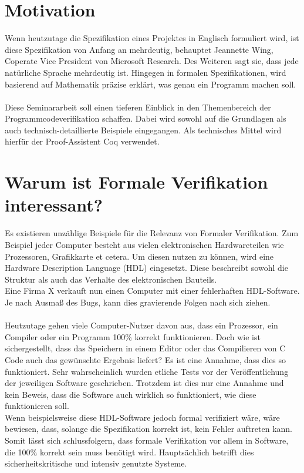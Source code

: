 \section{Motivation}
{Wenn heutzutage die Spezifikation eines Projektes in Englisch formuliert wird, ist diese Spezifikation von Anfang an mehrdeutig, behauptet Jeannette Wing, Coperate Vice President von Microsoft Research. Des Weiteren sagt sie, dass jede natürliche Sprache mehrdeutig ist. Hingegen in formalen Spezifikationen, wird basierend auf Mathematik präzise erklärt, was genau ein Programm machen soll.}\cite{WING01:FV}
\\
\\
Diese Seminararbeit soll einen tieferen Einblick in den Themenbereich der Programmcodeverifikation schaffen. Dabei wird sowohl auf die Grundlagen als auch technisch-detaillierte Beispiele eingegangen. Als technisches Mittel wird hierfür der Proof-Assistent Coq verwendet.


\section{Warum ist Formale Verifikation interessant?}
Es existieren unzählige Beispiele für die Relevanz von Formaler Verifikation. Zum Beispiel jeder Computer besteht aus vielen elektronischen Hardwareteilen wie Prozessoren, Grafikkarte et cetera. Um diesen nutzen zu können, wird eine Hardware Description Language (HDL) eingesetzt. Diese beschreibt sowohl die Struktur als auch das Verhalte des elektronischen Bauteils.\\
Eine Firma X verkauft nun einen Computer mit einer fehlerhaften HDL-Software. Je nach Ausmaß des Bugs, kann dies gravierende Folgen nach sich ziehen.\\
\\
Heutzutage gehen viele Computer-Nutzer davon aus, dass ein Prozessor, ein Compiler oder ein Programm 100\% korrekt funktionieren. Doch wie ist sichergestellt, dass das Speichern in einem Editor oder das Compilieren von C Code auch das gewünschte Ergebnis liefert? Es ist eine Annahme, dass dies so funktioniert. Sehr wahrscheinlich wurden etliche Tests vor der Veröffentlichung der jeweiligen Software geschrieben. Trotzdem ist dies nur eine Annahme und kein Beweis, dass die Software auch wirklich so funktioniert, wie diese funktionieren soll.
\\
Wenn beispielsweise diese HDL-Software jedoch formal verifiziert wäre, wäre bewiesen, dass, solange die Spezifikation korrekt ist, kein Fehler auftreten kann.\\
Somit lässt sich schlussfolgern, dass formale Verifikation vor allem in Software, die 100\% korrekt sein muss benötigt wird. Hauptsächlich betrifft dies sicherheitskritische und intensiv genutzte Systeme.


